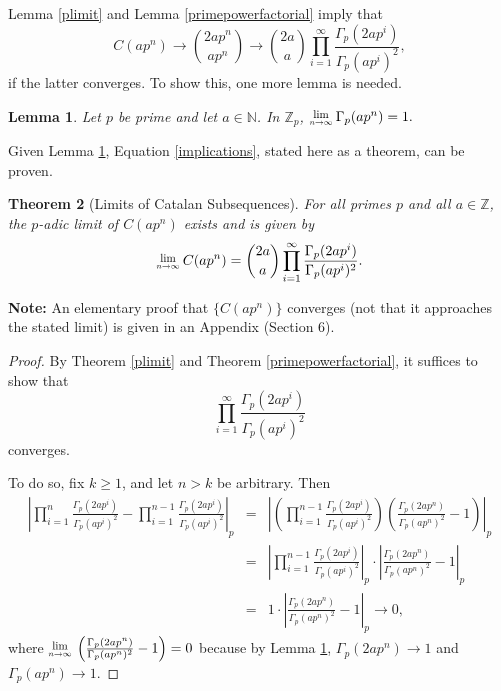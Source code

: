 \documentclass[12pt, letter]{article}    %
\theoremstyle{plain}
\newtheorem{theorem}{Theorem}[section]
\newtheorem{lemma}[theorem]{Lemma}
\theoremstyle{definition}
\numberwithin{equation}{section}
\newcommand{\Lim}[1]{\raisebox{0.5ex}{\scalebox{0.8}{$\displaystyle \lim_{#1}\;$}}}
\newcommand{\thref}[1]{Theorem \ref{#1}}
\newcommand{\lemref}[1]{Lemma \ref{#1}}
\newcommand{\thlabel}[1]{\label{#1}}
\begin{document}
\lemref{plimit} and \lemref{primepowerfactorial} imply that 
\begin{equation}
\label{implications}C(ap^n)\rightarrow {2ap^n \choose ap^n} \rightarrow {2a \choose a}\prod\limits_{i=1}^\infty \frac{\Gamma_p(2ap^i)}{\Gamma_p(ap^i)^2},
\end{equation} 
if the latter converges. To show this, one more lemma is needed.

\begin{lemma}\thlabel{p gamma}
Let $p$ be prime and let $a\in\mathbb{N}$. In $\mathbb{Z}_p$,
$\Lim{n\rightarrow \infty}\Gamma_p(ap^n)=1.$
\end{lemma} 

\noindent Given \lemref{p gamma}, Equation \eqref{implications}, stated here as a theorem, can be proven.

\begin{theorem}[Limits of Catalan Subsequences]\thlabel{limit thm}
For all primes $p$ and all $a\in\mathbb{Z}$, the $p$-adic limit of $C(ap^n)$ exists and is given by $$\Lim{n\rightarrow \infty} C(ap^n)=
\binom{2a}{a}\prod_{i=1}^{\infty}\frac{\Gamma_p(2ap^i)}{\Gamma_p(ap^i)^2}.$$
\end{theorem}

\noindent \textbf{Note:} An elementary proof that $\{C(ap^n)\}$ converges (not that it approaches the stated limit) is given in an Appendix (Section 6).

\begin{proof}
By \thref{plimit} and \thref{primepowerfactorial}, it suffices to show that $$\prod_{i=1}^\infty \frac{\Gamma_p(2ap^i)}{\Gamma_p(ap^i)^2}$$ converges.

To do so, fix $k\geq1$, and let $n>k$ be arbitrary. Then
\begin{eqnarray*}
\left|\prod_{i=1}^n \frac{\Gamma_p(2ap^i)}{\Gamma_p(ap^i)^2}-\prod_{i=1}^{n-1} \frac{\Gamma_p(2ap^i)}{\Gamma_p(ap^i)^2}\right|_p
&=&\left|\left(\prod_{i=1}^{n-1} \frac{\Gamma_p(2ap^i)}{\Gamma_p(ap^i)^2}\right)\left(\frac{\Gamma_p(2ap^n)}{\Gamma_p(ap^n)^2}-1\right)\right|_p\\
&=&\left|\prod_{i=1}^{n-1} \frac{\Gamma_p(2ap^i)}{\Gamma_p(ap^i)^2}\right|_p\cdot\left|\frac{\Gamma_p(2ap^n)}{\Gamma_p(ap^n)^2}-1\right|_p\\
&=&1\cdot\left|\frac{\Gamma_p(2ap^n)}{\Gamma_p(ap^n)^2}-1\right|_p\rightarrow0,
\end{eqnarray*}
where $\Lim{n\rightarrow\infty}\left(\frac{\Gamma_p(2ap^n)}{\Gamma_p(ap^n)^2}-1\right)=0$ because by \lemref{p gamma},  $\Gamma_p(2ap^n)\rightarrow 1$ and $\Gamma_p(ap^n)\rightarrow1$.  \end{proof}
\end{document}
